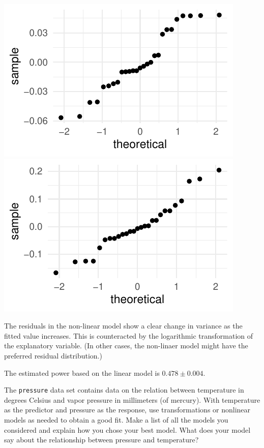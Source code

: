 \documentclass[twoside]{book}\usepackage[]{graphicx}\usepackage[]{xcolor}
\makeatletter
\def\maxwidth{ %
  \ifdim\Gin@nat@width>\linewidth
    \linewidth
  \else
    \Gin@nat@width
  \fi
}
\newenvironment{knitrout}{}{} %
\newcommand{\Rindex}[1]{\index{\texttt{#1}}}
\newcommand{\dataframe}[1]{{\color{blue!80!black}\texttt{#1}}\Rindex{#1}}
\makeatother
\begin{document}
\begin{solution}
\begin{knitrout}
{\centering \includegraphics[width=\maxwidth]{figures/fig-unnamed-chunk-259-1} 
\includegraphics[width=\maxwidth]{figures/fig-unnamed-chunk-259-2} 

}



\end{knitrout}
	
	The residuals in the non-linear model show a clear change 
	in variance as the fitted value increases.  This is counteracted by the logarithmic
	transformation of the explanatory variable.  (In other cases, the non-linaer model
	might have the preferred residual distribution.)
	
The estimated power based on the linear model is $0.478 \pm 0.004$.
\end{solution}


\begin{problem}
The \dataframe{pressure} data set contains 
data on the relation between temperature in degrees Celsius and 
vapor pressure in millimeters (of mercury).
With temperature as the predictor and pressure as the response,
use transformations or nonlinear models as needed to obtain a good fit.
Make a list of all the models you considered and explain
how you chose your best model.
What does your model say about the relationship between 
pressure and temperature?
\end{problem}
\end{document}

